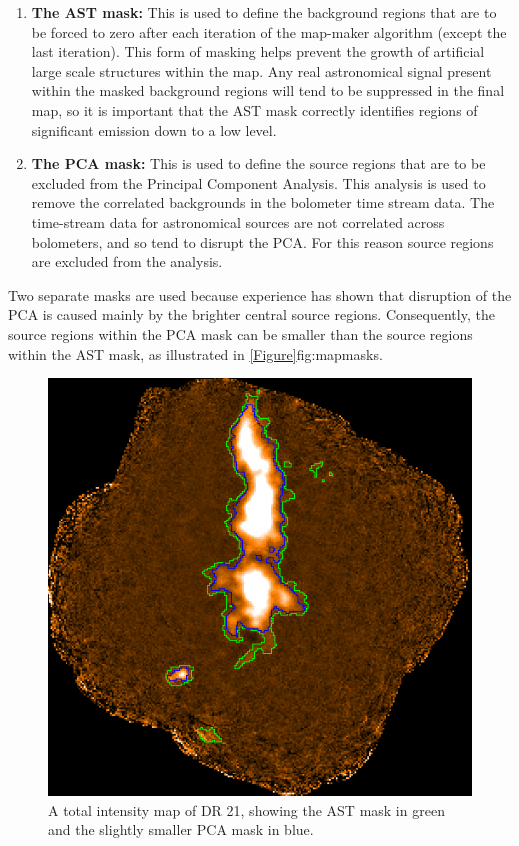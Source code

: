 \begin{enumerate}
\item {\bf The AST mask:} This is used to define the background regions that are to be forced to zero after each iteration of the map-maker algorithm (except the last iteration). This form of masking helps prevent the growth of artificial large scale structures within the map. Any real astronomical signal present within the masked background regions will tend to be suppressed in the final map, so it is important that the AST mask correctly identifies regions of significant emission down to a low level.
\item {\bf The PCA mask:} This is used to define the source regions that are to be excluded from the Principal Component Analysis. This analysis is used to remove the correlated backgrounds in the bolometer time stream data. The time-stream data for astronomical sources are not correlated across bolometers, and so tend to disrupt the PCA. For this reason source regions are excluded from the analysis.
\end{enumerate}

Two separate masks are used because experience has shown that disruption of the PCA is caused mainly by the brighter central source regions. Consequently, the source regions within the PCA mask can  be smaller than the source regions within the AST mask, as illustrated in \cref{Figure}{fig:mapmasks}{}.

\begin{figure}[ht!]
\begin{center}
\includegraphics[width=0.7\linewidth]{sc-22-map-masks-1.png}
\caption [Example POL-2 map of DR21, showing the difference between the two \poltwomap\ masks.]{A total intensity map of DR 21, showing the AST mask in green and the slightly smaller PCA mask in blue.
\label{fig:mapmasks}
}
\end{center}
\end{figure}

